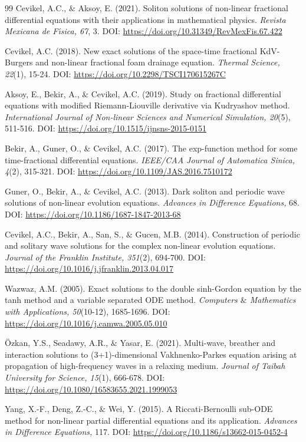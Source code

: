 \documentclass[10pt]{NSP1}
\numberwithin{equation}{section}
\begin{document}
\begin{thebibliography}{99}
 Cevikel, A.C., ${\&}$ Aksoy, E. (2021). Soliton solutions of non-linear fractional differential equations with their applications in mathematical physics. \emph{Revista Mexicana de F\'{\i}sica, 67}, 3. DOI: \url{https://doi.org/10.31349/RevMexFis.67.422}

 Cevikel, A.C. (2018). New exact solutions of the space-time fractional KdV-Burgers and non-linear fractional foam drainage equation. \emph{Thermal Science, 22}(1), 15-24. DOI: \url{https://doi.org/10.2298/TSCI170615267C}

 Aksoy, E., Bekir, A., ${\&}$ Cevikel, A.C. (2019). Study on fractional differential equations with modified Riemann-Liouville derivative via Kudryashov method. \emph{International Journal of Non-linear Sciences and Numerical Simulation, 20}(5), 511-516. DOI: \url{https://doi.org/10.1515/ijnsns-2015-0151}

 Bekir, A., Guner, O., ${\&}$ Cevikel, A.C. (2017). The exp-function method for some time-fractional differential equations. \emph{IEEE/CAA Journal of Automatica Sinica, 4}(2), 315-321. DOI: \url{https://doi.org/10.1109/JAS.2016.7510172}

 Guner, O., Bekir, A., ${\&}$ Cevikel, A.C. (2013). Dark soliton and periodic wave solutions of non-linear evolution equations. \emph{Advances in Difference Equations,} 68. DOI: \url{https://doi.org/10.1186/1687-1847-2013-68}

 Cevikel, A.C., Bekir, A., San, S., ${\&}$ Gucen, M.B. (2014). Construction of periodic and solitary wave solutions for the complex non-linear evolution equations. \emph{Journal of the Franklin Institute, 351}(2), 694-700. DOI: \url{https://doi.org/10.1016/j.jfranklin.2013.04.017}

 Wazwaz, A.M. (2005). Exact solutions to the double sinh-Gordon equation by the tanh method and a variable separated ODE method. \emph{Computers ${\&}$ Mathematics with Applications, 50}(10-12), 1685-1696. DOI: \url{https://doi.org/10.1016/j.camwa.2005.05.010}

 \"{O}zkan, Y.S., Seadawy, A.R., ${\&}$ Yasar, E. (2021). Multi-wave, breather and interaction solutions to (3+1)-dimensional Vakhnenko-Parkes equation arising at propagation of high-frequency waves in a relaxing medium. \emph{Journal of Taibah University for Science, 15}(1), 666-678. DOI: \url{https://doi.org/10.1080/16583655.2021.1999053}

 Yang, X.-F., Deng, Z.-C., ${\&}$ Wei, Y. (2015). A Riccati-Bernoulli sub-ODE method for non-linear partial differential equations and its application. \emph{Advances in Difference Equations,} 117. DOI: \url{https://doi.org/10.1186/s13662-015-0452-4}


\end{thebibliography}
\end{document}
